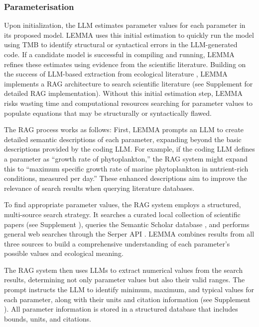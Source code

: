 \subsubsection{Parameterisation}
Upon initialization, the LLM estimates parameter values for each parameter in its proposed model. LEMMA uses this initial estimation to quickly run the model using TMB to identify structural or syntactical errors in the LLM-generated code. If a candidate model is successful in compiling and running, LEMMA refines these estimates using evidence from the scientific literature. Building on the success of LLM-based extraction from ecological literature \citep{keck2025extracting,spillias2024evaluating}, LEMMA implements a RAG architecture to search scientific literature (see Supplement %
for detailed RAG implementation). Without this initial estimation step, LEMMA risks wasting time and computational resources searching for parameter values to populate equations that may be structurally or syntactically flawed.

The RAG process works as follows: First, LEMMA prompts an LLM to create detailed semantic descriptions of each parameter, expanding beyond the basic descriptions provided by the coding LLM. For example, if the coding LLM defines a parameter as ``growth rate of phytoplankton,'' the RAG system might expand this to ``maximum specific growth rate of marine phytoplankton in nutrient-rich conditions, measured per day.'' These enhanced descriptions aim to improve the relevance of search results when querying literature databases.

To find appropriate parameter values, the RAG system employs a structured, multi-source search strategy. It searches a curated local collection of scientific papers (see Supplement%
), queries the Semantic Scholar database \citep{semantic_scholar_api}, and performs general web searches through the Serper API \citep{serper_api}. LEMMA combines results from all three sources to build a comprehensive understanding of each parameter's possible values and ecological meaning.

The RAG system then uses LLMs to extract numerical values from the search results, determining not only parameter values but also their valid ranges. The prompt instructs the LLM to identify minimum, maximum, and typical values for each parameter, along with their units and citation information (see Supplement%
). All parameter information is stored in a structured database that includes bounds, units, and citations. 

